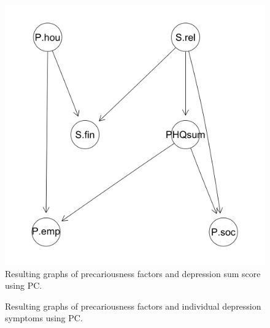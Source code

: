 \documentclass[
]{article}
\begin{document}
\begin{figure}
\begin{minipage}{0.50\linewidth}
{\includegraphics[width=1\textwidth,height=\textheight]{img/sum_PC_RCoTonly.png}

}


\end{minipage}%

\caption{\label{fig-pc_sum}Resulting graphs of precariousness factors
and depression sum score using PC.}

\end{figure}%

\begin{figure}


\caption{\label{fig-pc_sym}Resulting graphs of precariousness factors
and individual depression symptoms using PC.}

\end{figure}%
\end{document}
